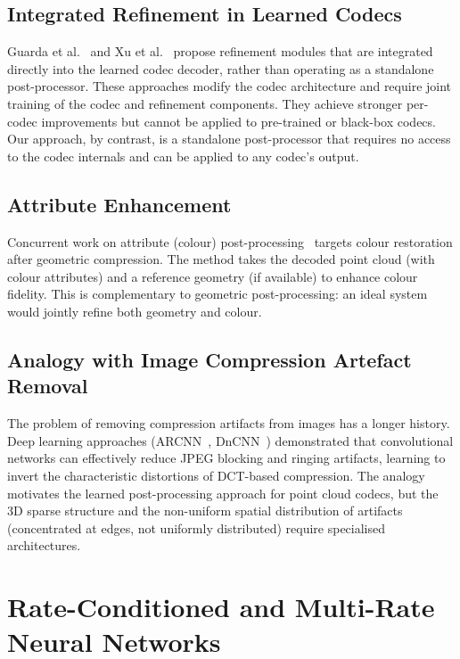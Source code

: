 \subsection{Integrated Refinement in Learned Codecs}

Guarda et al.~\cite{guarda2025deep} and Xu et al.~\cite{xu2024fast} propose
refinement modules that are integrated directly into the learned codec
decoder, rather than operating as a standalone post-processor.
These approaches modify the codec architecture and require joint training of
the codec and refinement components.
They achieve stronger per-codec improvements but cannot be applied to
pre-trained or black-box codecs.
Our approach, by contrast, is a standalone post-processor that requires no
access to the codec internals and can be applied to any codec's output.

\subsection{Attribute Enhancement}

Concurrent work on attribute (colour) post-processing~\cite{ugae2025} targets
colour restoration after geometric compression.
The method takes the decoded point cloud (with colour attributes) and a
reference geometry (if available) to enhance colour fidelity.
This is complementary to geometric post-processing: an ideal system would
jointly refine both geometry and colour.

\subsection{Analogy with Image Compression Artefact Removal}

The problem of removing compression artifacts from images has a longer
history.
Deep learning approaches (ARCNN~\cite{dong2015compression}, DnCNN~\cite{zhang2017dncnn})
demonstrated that convolutional networks can effectively reduce JPEG blocking
and ringing artifacts, learning to invert the characteristic distortions of
DCT-based compression.
The analogy motivates the learned post-processing approach for point cloud
codecs, but the 3D sparse structure and the non-uniform spatial distribution
of artifacts (concentrated at edges, not uniformly distributed) require
specialised architectures.

\section{Rate-Conditioned and Multi-Rate Neural Networks}
\label{sec:related-rate}

